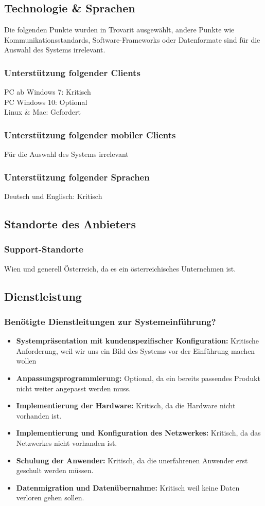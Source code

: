 \subsection{Technologie \& Sprachen}
Die folgenden Punkte wurden in Trovarit ausgewählt, andere Punkte wie Kommunikationsstandards, Software-Frameworks oder Datenformate sind für die Auswahl des Systems irrelevant.
\subsubsection{Unterstützung folgender Clients}
PC ab Windows 7: Kritisch\\
PC Windows 10: Optional\\
Linux \& Mac: Gefordert
\subsubsection{Unterstützung folgender mobiler Clients}
Für die Auswahl des Systems irrelevant
\subsubsection{Unterstützung folgender Sprachen}
Deutsch und Englisch: Kritisch

\subsection{Standorte des Anbieters}
\subsubsection{Support-Standorte}
Wien und generell Österreich, da es ein österreichisches Unternehmen ist.
\subsection{Dienstleistung}
\subsubsection{Benötigte Dienstleitungen zur Systemeinführung?}
\begin{itemize}
	\item \textbf{Systempräsentation mit kundenspezifischer Konfiguration:} Kritische Anforderung, weil wir uns ein Bild des Systems vor der Einführung machen wollen
	\item \textbf{Anpassungsprogrammierung:} Optional, da ein bereits passendes Produkt nicht weiter angepasst werden muss.
	\item \textbf{Implementierung der Hardware:} Kritisch, da die Hardware nicht vorhanden ist.
	\item \textbf{Implementierung und Konfiguration des Netzwerkes:} Kritisch, da das Netzwerkes nicht vorhanden ist.
	\item \textbf{Schulung der Anwender:} Kritisch, da die unerfahrenen Anwender erst geschult werden müssen.
	\item \textbf{Datenmigration und Datenübernahme:} Kritisch weil keine Daten verloren gehen sollen.
\end{itemize}
